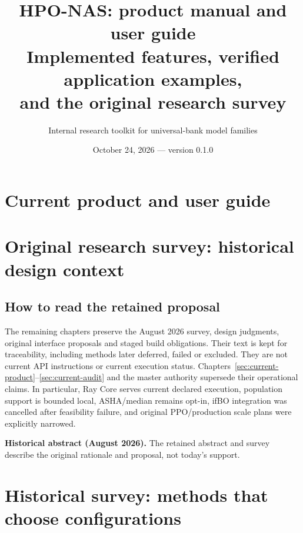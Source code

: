 \documentclass[11pt]{report}
\title{HPO-NAS: product manual and user guide\\
Implemented features, verified application examples,\\
and the original research survey}
\author{Internal research toolkit for universal-bank model families}
\date{October 24, 2026 --- version 0.1.0}
\newenvironment{decisions}{%
  \def\FrameCommand{{\color{blue!50!black}\vrule width 2.5pt}\hspace{8pt}}%
  \MakeFramed{\advance\hsize-\width\FrameRestore}\small}%
{\endMakeFramed}
\begin{document}
\maketitle

\begin{abstract}

\end{abstract}

\setcounter{tocdepth}{1}
\tableofcontents
\clearpage

\part{Current product and user guide}





\clearpage
\sloppy
\addtolength{\textheight}{5pt}
\part{Original research survey: historical design context}
\chapter*{How to read the retained proposal}
The remaining chapters preserve the August 2026 survey, design judgments,
original interface proposals and staged build obligations. Their text is kept
for traceability, including methods later deferred, failed or excluded.
They are not current API instructions or current execution status.
Chapters~\ref{sec:current-product}--\ref{sec:current-audit} and the master
authority supersede their operational claims. In particular, Ray Core serves
current declared execution, population support is bounded local, ASHA/median
remains opt-in, ifBO integration was cancelled after feasibility failure, and
original PPO/production scale plans were explicitly narrowed.

\begin{decisions}
\textbf{Historical abstract (August 2026).} The retained abstract and survey
describe the original rationale and proposal, not today's support.
\end{decisions}

\clearpage



\part{Historical survey: methods that choose configurations}


\end{document}
